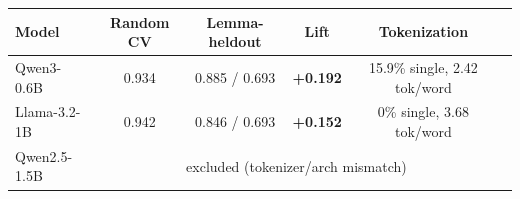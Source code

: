 \begin{tabular}{lccccc}
\toprule
Model & Random CV & Lemma-heldout & Lift & Tokenization \\
\midrule
  Qwen3-0.6B & 0.934 & 0.885 / 0.693 & \textbf{+0.192} & 15.9\% single, 2.42 tok/word \\
  Llama-3.2-1B & 0.942 & 0.846 / 0.693 & \textbf{+0.152} & 0\% single, 3.68 tok/word \\
  Qwen2.5-1.5B & \multicolumn{4}{c}{excluded (tokenizer/arch mismatch)} \\
\bottomrule
\end{tabular}
